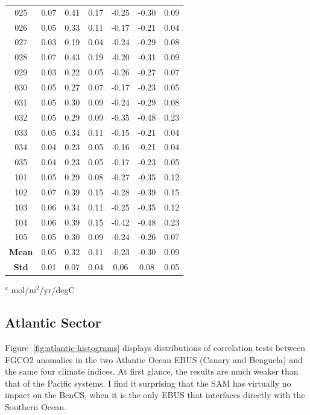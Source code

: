 \documentclass[12pt]{article}
\begin{document}
\begin{table}[!h]
\begin{tabular}{c c c c | c c c}
		025 &   0.07 &     0.41 &       0.17 &  -0.25 &    -0.30 &       0.09 \\
		026 &   0.05 &     0.33 &       0.11 &  -0.17 &    -0.21 &       0.04 \\
		027 &   0.03 &     0.19 &       0.04 &  -0.24 &    -0.29 &       0.08 \\
		028 &   0.07 &     0.43 &       0.19 &  -0.20 &    -0.31 &       0.09 \\
		029 &   0.03 &     0.22 &       0.05 &  -0.26 &    -0.27 &       0.07 \\
		030 &   0.05 &     0.27 &       0.07 &  -0.17 &    -0.23 &       0.05 \\
		031 &   0.05 &     0.30 &       0.09 &  -0.24 &    -0.29 &       0.08 \\
		032 &   0.05 &     0.29 &       0.09 &  -0.35 &    -0.48 &       0.23 \\
		033 &   0.05 &     0.34 &       0.11 &  -0.15 &    -0.21 &       0.04 \\
		034 &   0.04 &     0.23 &       0.05 &  -0.16 &    -0.21 &       0.04 \\
		035 &   0.04 &     0.23 &       0.05 &  -0.17 &    -0.23 &       0.05 \\
		101 &   0.05 &     0.29 &       0.08 &  -0.27 &    -0.35 &       0.12 \\
		102 &   0.07 &     0.39 &       0.15 &  -0.28 &    -0.39 &       0.15 \\
		103 &   0.06 &     0.34 &       0.11 &  -0.25 &    -0.35 &       0.12 \\
		104 &   0.06 &     0.39 &       0.15 &  -0.42 &    -0.48 &       0.23 \\
		105 &   0.05 &     0.30 &       0.09 &  -0.24 &    -0.26 &       0.07 \\
		\bottomrule
		\textbf{Mean} & 0.05 & 0.32 & 0.11 & -0.23 & -0.30 & 0.09 \\
		\textbf{Std} & 0.01 & 0.07 & 0.04 & 0.06 & 0.08 & 0.05
	\end{tabular}
	\begin{tablenotes}
		\centering
		\item $^{a}$ mol/m$^{2}$/yr/degC
	\end{tablenotes}
	\label{tab:pdo-pacific}
\end{table}
\clearpage
\subsection{Atlantic Sector}
Figure~\ref{fig:atlantic-histograms} displays distributions of correlation tests between FGCO2 anomalies in the two Atlantic Ocean EBUS (Canary and Benguela) and the same four climate indices. At first glance, the results are much weaker than that of the Pacific systems. I find it surprising that the SAM has virtually no impact on the BenCS, when it is the only EBUS that interfaces directly with the Southern Ocean. \\
\end{document}
